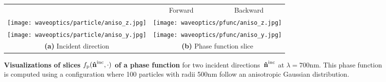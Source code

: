 \begin{figure}[h]
    \centering
    \setlength{\resLen}{1.5in}
    \addtolength{\tabcolsep}{3pt}
    \begin{tabular}{ccc}
        & Forward & Backward\\
        \texttt{[image: waveoptics/particle/aniso\_z.jpg]}
        & \multicolumn{2}{c}{\texttt{[image: waveoptics/pfunc/aniso\_z.jpg]}}
        \\
        \texttt{[image: waveoptics/particle/aniso\_y.jpg]}
        & \multicolumn{2}{c}{\texttt{[image: waveoptics/pfunc/aniso\_y.jpg]}}
        \\
        \textbf{(a)} Incident direction & \multicolumn{2}{c}{\textbf{(b)} Phase function slice}
    \end{tabular}
    \caption[Visualizations of phase function]{\label{fig:waveoptics:aniso1}
        \textbf{Visualizations of slices $f_\mathrm{p}(\mathbf{\hat{n}}^{\text{inc}},\cdot)$ of a phase function} for two incident directions~$\mathbf{\hat{n}}^{\text{inc}}$ at $\lambda = 700\text{nm}$.
        This phase function is computed using a configuration where 100 particles with radii 500nm follow an anisotropic Gaussian distribution.
    }
\end{figure}
